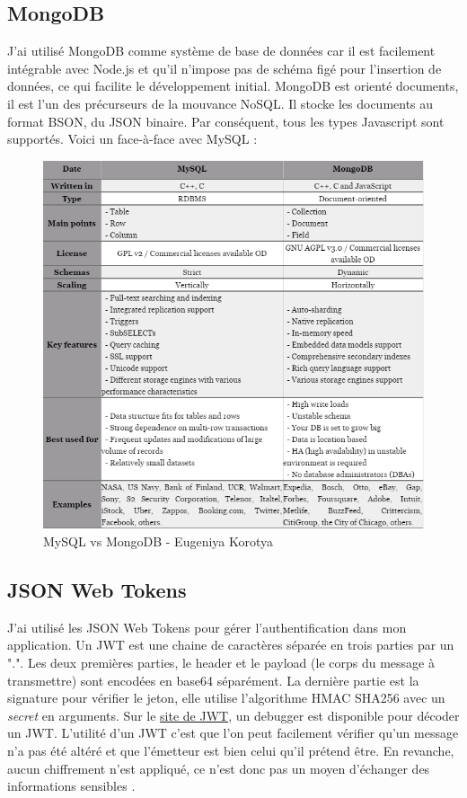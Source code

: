 \documentclass[a4paper, 12pt]{article}
\begin{document}
\subsection{MongoDB}
J'ai utilisé MongoDB comme système de base de données car il est facilement intégrable avec Node.js et qu'il n'impose 
pas de schéma figé pour l'insertion de données, ce qui facilite le développement initial. MongoDB est orienté documents, 
il est l'un des précurseurs de la mouvance NoSQL. Il stocke les documents au format BSON, du JSON binaire. Par conséquent, 
tous les types Javascript sont supportés. Voici un face-à-face avec MySQL :
\begin{figure}
    \begin{center}
        \includegraphics[width=1\textwidth]{images/mysql_mongodb.png}
    \end{center}
    \caption{MySQL vs MongoDB - Eugeniya Korotya \cite{ref160}}
\end{figure}

\subsection{JSON Web Tokens}
J'ai utilisé les JSON Web Tokens pour gérer l'authentification dans mon application. Un JWT est une chaine de 
caractères séparée en trois parties par un ".". Les deux premières parties, le header et le payload (le corps du 
message à transmettre) sont encodées en base64 séparément. La dernière partie est la signature pour vérifier le jeton, 
elle utilise l'algorithme HMAC SHA256 avec un \textit{secret} en arguments. Sur le \href{https://jwt.io/}{site de JWT}, 
un debugger est disponible pour décoder un JWT. L'utilité d'un JWT c'est que l'on peut facilement vérifier qu'un message 
n'a pas été altéré et que l'émetteur est bien celui qu'il prétend être. En revanche, aucun chiffrement n'est appliqué, 
ce n'est donc pas un moyen d'échanger des informations sensibles \cite{ref190}.
\end{document}
